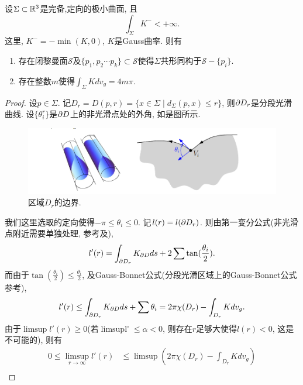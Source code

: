 \begin{theorem}
    设$\Sigma \subset \R^3$是完备,定向的极小曲面, 且
    \begin{equation}
        \int_\Sigma K^- < +\infty. 
    \end{equation}
    这里, $K^-=-\min(K,0)$, $K$是Gauss曲率. 则有
    \begin{enumerate}
        \item 存在闭黎曼面$\mathcal{S}$及$\{p_1,p_2\cdots p_k\} \subset \mathcal{S}$使得$\Sigma$共形同构于$\mathcal{S}-\{p_i\}$.
        \item 存在整数$m$使得$\int_\Sigma Kdv_g = 4m\pi$.
    \end{enumerate}
\end{theorem}
\begin{proof}
    设$p \in \Sigma$. 记$D_r=D(p,r)=\{x\in \Sigma \mid d_\Sigma(p,x) \le r\}$, 则$\P D_r$是分段光滑曲线. 设$\{\theta^r_i\}$是$\P D$上的非光滑点处的外角, 如是图所示.
    \begin{figure}[ht]
        \centering
        \includegraphics[scale=0.8]{images/angle.png}
        \caption{区域$D_r$的边界.}
        \label{angle}
    \end{figure}
    我们这里选取的定向使得$-\pi \le \theta_i \le 0$.  记$l(r)=l(\P D_r)$. 则由第一变分公式(非光滑点附近需要单独处理, 参考\cite{White}及\cite{Perez}),
    \begin{equation}
        l'(r)=\int_{\P D_r}K_{\P D}ds+2\sum \tan(\frac{\theta_i}{2}).
    \end{equation}
    而由于$\tan(\frac{\theta_i}{2}) \le \frac{\theta_i}{2}$, 及Gauss-Bonnet公式(分段光滑区域上的Gauss-Bonnet公式参考\cite{lee}),
    \begin{equation}
        l'(r)\le \int_{\P D_r}K_{\P D}ds+\sum \theta_i = 2\pi\chi(D_r)-\int_{D_r}Kdv_g.
    \end{equation}
    由于$\mathop{\limsup} l'(r) \ge 0$(若$ \mathop{\limsup l'(r)} \le \alpha <0$, 则存在$r$足够大使得$l(r) < 0$, 这是不可能的), 则有
    \begin{equation} \label{basic_inequality}
        \begin{split}
            0 \le \limsup_{r\to \infty} l'(r) &\le \limsup(2\pi \chi(D_r) - \int_{D_r}Kdv_g) \\

\end{split}
\end{equation}
\end{proof}
